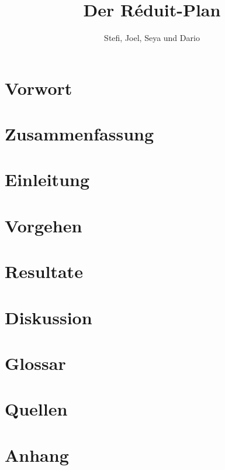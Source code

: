 \documentclass[opensans]{article}
\title{Der Réduit-Plan}
\author{Stefi, Joel, Seya und Dario}
\begin{document}
\begin{titlepage}
    \maketitle
\end{titlepage}

\tableofcontents

\newpage

\section{Vorwort} \label{Vorwort}

\newpage 

\section{Zusammenfassung} \label{Zusammenfassung}

\newpage

\section{Einleitung} \label{Einleitung}

\newpage

\section{Vorgehen} \label{Vorgehen}

\newpage

\section{Resultate} \label{Resultate}

\newpage

\section{Diskussion} \label{Diskussion}

\newpage

\section{Glossar} \label{Glossar}
\printglossaries
\newpage

\section{Quellen} \label{Quellen}
\printbibliography
\newpage

\section{Anhang} \label{Anhang}

 
\end{document}
